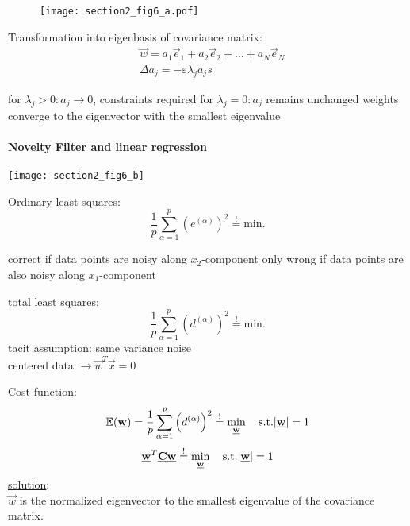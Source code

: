 \begin{figure}[h]
\centering
\texttt{[image: section2\_fig6\_a.pdf]}
\end{figure}
Transformation into eigenbasis of covariance matrix:
\begin{align*}
			& \vec{w} = a_1 \vec{e}_1 + a_2 \vec{e}_2 + \dots + a_N \vec{e}_N\\
			& \Delta a_j = - \varepsilon \lambda_j a_j
s\end{align*}

\begin{itemize}
			\itl for $\lambda_j > 0: a_j \rightarrow 0$, constraints required
			\itl for $\lambda_j = 0: a_j$ remains unchanged
			\itl weights converge to the eigenvector with the smallest eigenvalue
\end{itemize}
\paragraph{Novelty Filter and linear regression}
\begin{center}
		\texttt{[image: section2\_fig6\_b]} \\
\end{center}
Ordinary least squares:\\
\begin{equation*}
		\frac{1}{p} \sum_{\alpha = 1}^{p} \left( e^{(\alpha)} \right)^2 \overset{!}{=} \text{min.}
\end{equation*}
\begin{itemize}
			\itl correct if data points are noisy along $x_2$-component only
			\itl wrong if data points are also noisy along $x_1$-component
\end{itemize}
total least squares:\\
\begin{equation*}
				\frac{1}{p} \sum_{\alpha =1}^{p} \left( d^{(\alpha)} \right)^2 \overset{!}{=} \text{min.}
\end{equation*}
tacit assumption: same variance noise \\
	centered data $\rightarrow \vec{w}^T\vec{x} = 0$ 

Cost function:
\begin{equation*}
		\mathbb{E}(\underline{\mathbf{w}}) = \frac{1}{p} \sum_{\alpha =1}^{p} \left( d^{(\alpha)} \right)^2 \stackrel{!}{=} \min_{\underline{\mathbf{w}}} \quad \text{s.t.} \abs{\underline{\mathbf{w}}} = 1
\end{equation*}
\begin{equation*}
			\underline{\mathbf{w}}^T \underline{\mathbf{C}} \underline{\mathbf{w}} \overset{!}{=} \min_{\underline{\mathbf{w}}} \quad \text{s.t.} \abs{\underline{\mathbf{w}}} = 1
\end{equation*}
\underline{solution}:\\
		$\vec{w}$ is the normalized eigenvector to the smallest eigenvalue of the covariance matrix.

